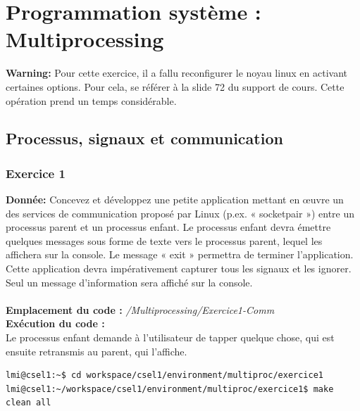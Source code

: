 \newpage
\section{Programmation système : Multiprocessing}
\textbf{Warning: } Pour cette exercice, il a fallu reconfigurer le noyau linux en activant certaines options. Pour cela, se référer à la slide 72 du support de cours. Cette opération prend un temps considérable.
\subsection{Processus, signaux et communication}
\subsubsection{Exercice 1}
\textbf{Donnée:} Concevez	et	développez	une	petite	application	mettant	en	œuvre	un	des	services	de	communication
proposé	par	Linux	(p.ex.	« socketpair ») entre	un	processus	parent	et	un	processus	enfant.	
Le	processus	enfant	devra	émettre	quelques	messages	sous	forme	de	texte	vers	le	processus	parent,	
lequel	les	affichera	sur	la	console.	Le	message	« exit »	permettra	de	terminer	l’application.
Cette	application	devra	impérativement	capturer	tous	les	signaux	et	les	ignorer.	Seul	un	message	
d’information	sera	affiché	sur	la	console.\\\\
\textbf{Emplacement du code : } \textit{/Multiprocessing/Exercice1-Comm}\\

\textbf{Exécution du code : } \\
Le processus enfant demande à l'utilisateur de tapper quelque chose, qui est ensuite retransmis au parent, qui l'affiche. \\
\begin{lstlisting}
lmi@csel1:~$ cd workspace/csel1/environment/multiproc/exercice1
lmi@csel1:~/workspace/csel1/environment/multiproc/exercice1$ make clean all
\end{lstlisting}

